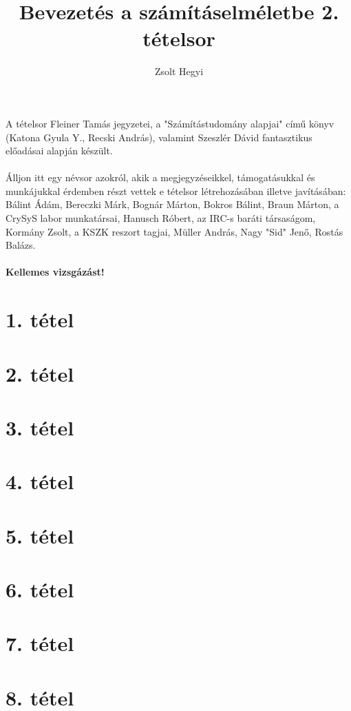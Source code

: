 \documentclass[]{article}
\title{Bevezetés a számításelméletbe 2. tételsor}
\author{Zsolt Hegyi}
\date{}
\begin{document}
\maketitle
\noindent A tételsor Fleiner Tamás jegyzetei, a "Számítástudomány alapjai" című könyv (Katona Gyula Y., Recski András), valamint Szeszlér Dávid fantasztikus előadásai alapján készült.
\\
\\
\noindent Álljon itt egy névsor azokról, akik a megjegyzéseikkel, támogatásukkal és munkájukkal érdemben részt vettek e tételsor létrehozásában illetve javításában:
\\
\indent Bálint Ádám, Bereczki Márk, Bognár Márton, Bokros Bálint, Braun Márton, a CrySyS labor munkatársai,  Hanusch Róbert, az IRC-s baráti társaságom, Kormány Zsolt, a KSZK reszort tagjai, Müller András, Nagy "Sid" Jenő, Rostás Balázs.
\\\\
\noindent \textbf{Kellemes vizsgázást!} %
\tableofcontents{}
\newpage
\section{1. tétel}

\newpage
\section{2. tétel}

\newpage
\section{3. tétel}

\newpage
\section{4. tétel}

\newpage
\section{5. tétel}

\newpage
\section{6. tétel}

\newpage
\section{7. tétel}

\newpage
\section{8. tétel}

\newpage
\end{document}
